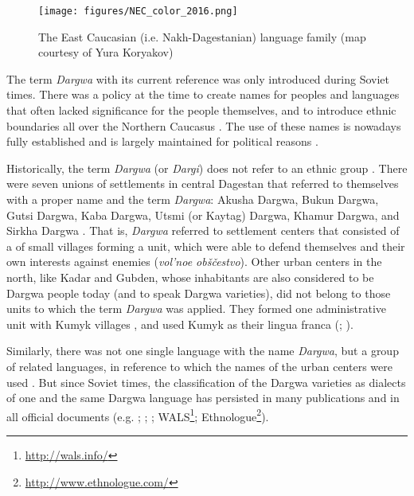\begin{figure}[t!]
	\caption{The East Caucasian (i.e. Nakh-Dagestanian) language family (map courtesy of Yura Koryakov)}
	\label{fig:Map 3}
	\texttt{[image: figures/NEC\_color\_2016.png]}
\end{figure}

The term \textit{Dargwa} with its current reference was only introduced during Soviet times. There was a policy at the time to create names for peoples and languages that often lacked significance for the people themselves, and to introduce ethnic boundaries all over the Northern Caucasus \citep[114]{Grenoble2003}. The use of these names is nowadays fully established and is largely maintained for political reasons \citep{Shaxbanov2009}.

Historically, the term \textit{Dargwa} (or \textit{Dargi}) does not refer to an ethnic group \citep[13]{Abdullaev1954}. There were seven unions of settlements in central Dagestan that referred to themselves with a proper name and the term \textit{Dargwa}: Akusha Dargwa, Bukun Dargwa, Gutsi Dargwa, Kaba Dargwa, Utsmi (or Kaytag) Dargwa, Khamur Dargwa, and Sirkha Dargwa \citep[13]{Magomedov1999}. That is, \textit{Dargwa} referred to settlement centers that consisted of a  of small villages forming a unit, which were able to defend themselves and their own interests against enemies (\textit{vol'noe obščestvo}). Other urban centers in the north, like Kadar and Gubden, whose inhabitants are also considered to be Dargwa people today (and to speak Dargwa varieties), did not belong to those units to which the term \textit{Dargwa} was applied. They formed one administrative unit with Kumyk villages \citep[12]{Abdullaev1954}, and used Kumyk as their lingua franca (\citealt{DobrushinaDanielKoryakov}; \citealt[58]{Wixman1980}). 

Similarly, there was not one single language with the name \textit{Dargwa}, but a group of related languages, in reference to which the names of the urban centers were used \citep[1]{Uslar1892}. But since Soviet times, the classification of the Dargwa varieties as dialects of one and the same Dargwa language has persisted in many publications and in all official documents (e.g. ; ; ; WALS\footnote{\url{http://wals.info/}}; Ethnologue\footnote{\url{http://www.ethnologue.com/}}).

